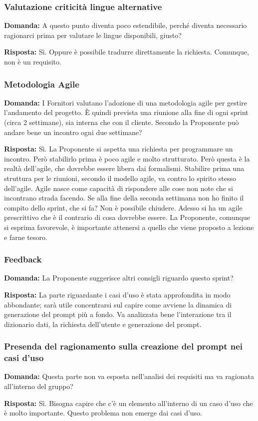 \subsubsection{Valutazione criticità lingue alternative}

\textbf{Domanda:} A questo punto diventa poco estendibile, perché diventa necessario ragionarci prima per valutare le lingue disponibili, giusto?

\textbf{Risposta:} Sì. Oppure è possibile tradurre direttamente la richiesta. Comunque, non è un requisito.

\subsubsection{Metodologia Agile}

\textbf{Domanda:} I Fornitori valutano l’adozione di una metodologia agile per gestire l'andamento del progetto. È quindi prevista una riunione alla fine di ogni sprint (circa 2 settimane), sia interna che con il cliente. Secondo la Proponente può andare bene un incontro ogni due settimane?

\textbf{Risposta:} Sì. La Proponente si aspetta una richiesta per programmare un incontro. Però stabilirlo prima è poco agile e molto strutturato. Però questa è la realtà dell'agile, che dovrebbe essere libera dai formalismi. Stabilire prima una struttura per le riunioni, secondo il modello agile, va contro lo spirito stesso dell'agile.
Agile nasce come capacità di rispondere alle cose non note che si incontrano strada facendo. Se alla fine della seconda settimana non ho finito il compito dello sprint, che si fa? Non è possibile chiudere. Adesso si ha un agile prescrittivo che è il contrario di cosa dovrebbe essere. La Proponente, comunque si esprima favorevole, è importante attenersi a quello che viene proposto a lezione e farne tesoro.

\subsubsection{Feedback}

\textbf{Domanda:} La Proponente suggerisce altri consigli riguardo questo sprint?

\textbf{Risposta:} La parte riguardante i casi d’uso è stata approfondita in modo abbondante; sarà utile concentrarsi sul capire come avviene la dinamica di generazione del prompt più a fondo.
Va analizzata bene l'interazione tra il dizionario dati, la richiesta dell'utente e generazione del prompt.

\subsubsection{Presenda del ragionamento sulla creazione del prompt nei casi d'uso}

\textbf{Domanda:} Questa parte non va esposta nell'analisi dei requisiti ma va ragionata all'interno del gruppo?

\textbf{Risposta:} Sì. Bisogna capire che c'è un elemento all'interno di un caso d'uso che è molto importante.
Questo problema non emerge dai casi d'uso.